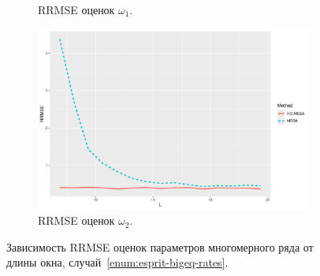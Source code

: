 \documentclass[specialist,
  substylefile=spbu_report.rtx,
subf,href,colorlinks=true, 12pt]{disser}
\theoremstyle{plain}
\theoremstyle{definition}
\theoremstyle{remark}
\begin{document}
\begin{figure}[!ht]
\begin{subfigure}{0.49\linewidth}
    \caption{RRMSE оценок $\omega_1$.}
    \label{fig:freq1_L_large_eq_rates}
  \end{subfigure}
  \begin{subfigure}{0.49\linewidth}
    \includegraphics[width=\linewidth, height=0.167\textheight]{freq2_L_large_eq_rates.pdf}
    \caption{RRMSE оценок $\omega_2$.}
    \label{fig:freq2_L_large_eq_rates}
  \end{subfigure}
  \caption{Зависимость RRMSE оценок параметров многомерного ряда от длины окна,
  случай~\ref{enum:esprit-bigeq-rates}.}
  \label{fig:L_large_eq_rates}
\end{figure}
\end{document}
